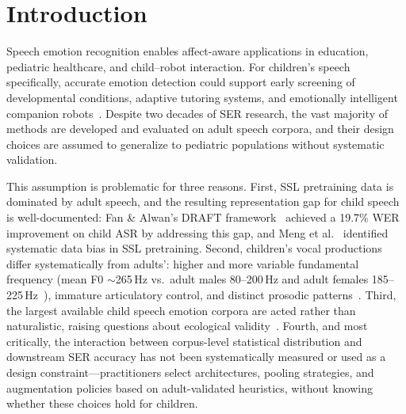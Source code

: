 \documentclass[11pt,a4paper]{article}
\begin{document}

\section{Introduction}
\label{sec:introduction}

Speech emotion recognition enables affect-aware applications in education,
pediatric healthcare, and child--robot interaction. For children's speech
specifically, accurate emotion detection could support early screening of
developmental conditions, adaptive tutoring systems, and emotionally
intelligent companion robots~\cite{batliner2011fau}. Despite two decades of SER
research, the vast majority of methods are developed and evaluated on adult
speech corpora, and their design choices are assumed to generalize to pediatric
populations without systematic validation.

This assumption is problematic for three reasons. First, SSL pretraining data
is dominated by adult speech, and the resulting representation gap for child
speech is well-documented: Fan \& Alwan's DRAFT framework~\cite{fan2023draft}
achieved a 19.7\% WER improvement on child ASR by addressing this gap, and
Meng et al.~\cite{meng2022data} identified systematic data bias in SSL
pretraining. Second, children's vocal productions differ systematically from
adults': higher and more variable
fundamental frequency (mean F0 $\sim$265\,Hz vs.\ adult males 80--200\,Hz
and adult females 185--225\,Hz~\cite{ncvs2025normative}), immature
articulatory control, and distinct prosodic
patterns~\cite{lee2007interspeech,tavares2010normative}. Third, the largest
available child speech emotion corpora are acted rather than naturalistic,
raising questions about ecological validity~\cite{batliner2011fau}. Fourth, and
most critically, the interaction between corpus-level statistical distribution
and downstream SER accuracy has not been systematically measured or used as a
design constraint---practitioners select architectures, pooling strategies, and
augmentation policies based on adult-validated heuristics, without knowing
whether these choices hold for children.
\end{document}
